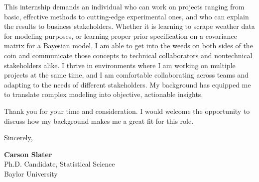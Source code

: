 \documentclass[11pt]{article}
\begin{document}
This internship demands an individual who can work on projects ranging from basic, effective methods to cutting-edge experimental ones, and who can explain the results to business stakeholders. Whether it is learning to scrape weather data for modeling purposes, or learning proper prior specification on a covariance matrix for a Bayesian model, I am able to get into the weeds on both sides of the coin and communicate those concepts to technical collaborators and nontechnical stakeholders alike. I thrive in environments where I am working on multiple projects at the same time, and I am comfortable collaborating across teams and adapting to the needs of different stakeholders. My background has equipped me to translate complex modeling into objective, actionable insights.

Thank you for your time and consideration. I would welcome the opportunity to discuss how my background makes me a great fit for this role.

\vspace{1em}
\noindent
Sincerely,

\vspace{1em}
\noindent
\textbf{Carson Slater} \\
Ph.D. Candidate, Statistical Science \\
Baylor University
\end{document}
